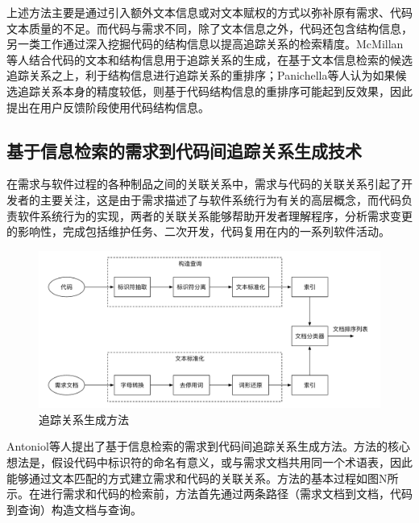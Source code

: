 上述方法主要是通过引入额外文本信息或对文本赋权的方式以弥补原有需求、代码文本质量的不足。而代码与需求不同，除了文本信息之外，代码还包含结构信息，另一类工作通过深入挖掘代码的结构信息以提高追踪关系的检索精度。McMillan等人\cite{mcmillan2009combining}结合代码的文本和结构信息用于追踪关系的生成，在基于文本信息检索的候选追踪关系之上，利于结构信息进行追踪关系的重排序；Panichella等人\cite{panichella2013and}认为如果候选追踪关系本身的精度较低，则基于代码结构信息的重排序可能起到反效果，因此提出在用户反馈阶段使用代码结构信息。

\subsection{基于信息检索的需求到代码间追踪关系生成技术}

在需求与软件过程的各种制品之间的关联关系中，需求与代码的关联关系引起了开发者的主要关注，这是由于需求描述了与软件系统行为有关的高层概念，而代码负责软件系统行为的实现，两者的关联关系能够帮助开发者理解程序，分析需求变更的影响性，完成包括维护任务、二次开发，代码复用在内的一系列软件活动。

\begin{figure}[thb]
    \centering
    \includegraphics[width=1.0\textwidth]{./figures/related_work/ir_traceability_process.pdf}
    \caption{追踪关系生成方法}
    \label{F:BuildLogScrn}
\end{figure}


Antoniol等人\cite{antoniol2002recovering}提出了基于信息检索的需求到代码间追踪关系生成方法。方法的核心想法是，假设代码中标识符的命名有意义，或与需求文档共用同一个术语表，因此能够通过文本匹配的方式建立需求和代码的关联关系。方法的基本过程如图N所示。在进行需求和代码的检索前，方法首先通过两条路径（需求文档到文档，代码到查询）构造文档与查询。

